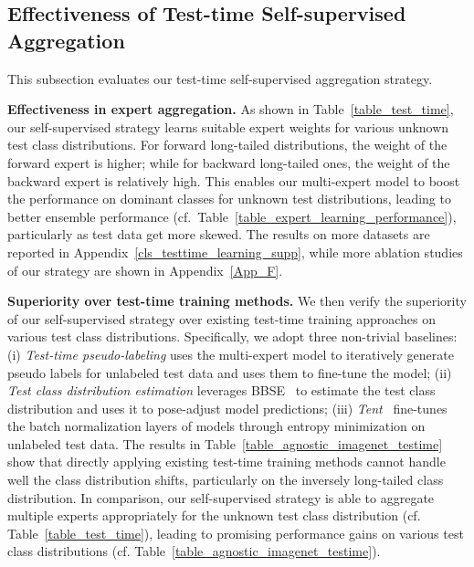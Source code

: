 \documentclass{article}
\begin{document}
\subsection{Effectiveness of Test-time Self-supervised Aggregation}
\label{cls_testtime_learning}
This subsection evaluates our test-time self-supervised aggregation strategy.

\textbf{Effectiveness in expert aggregation.} As shown in Table~\ref{table_test_time}, our self-supervised   strategy    learns suitable expert   weights for  various unknown   test class distributions.  For   forward long-tailed   distributions, the weight of  the forward expert  is higher; while for     backward long-tailed   ones,  the weight of  the  backward expert  is relatively high. This enables our multi-expert model to boost the performance  on   dominant  classes  for   unknown test   distributions, leading to   better ensemble performance (cf.~Table~\ref{table_expert_learning_performance}), particularly as test data get  more skewed.    The      results on more datasets  are reported in Appendix~\ref{cls_testtime_learning_supp}, while more ablation studies of our strategy are shown in Appendix~\ref{App_F}. 

 

\textbf{Superiority over test-time training methods.} We then verify the superiority of our self-supervised   strategy over existing test-time training approaches  on various test class distributions. Specifically, we adopt three non-trivial baselines: (i) \emph{Test-time pseudo-labeling}  uses the multi-expert  model to iteratively generate  pseudo  labels  for unlabeled test data and  uses them to fine-tune the    model; (ii) \emph{Test class distribution estimation}  leverages BBSE~\cite{lipton2018detecting} to estimate the test class distribution and   uses it to pose-adjust model predictions;
  (iii) \emph{Tent}~\cite{wang2021tent}  fine-tunes the batch normalization layers  of models through entropy minimization  on unlabeled test data. The results in Table~\ref{table_agnostic_imagenet_testime} show  that directly   applying  existing  test-time training methods cannot handle well the class distribution shifts, particularly on the inversely 
long-tailed class distribution. In comparison, our self-supervised  strategy is able to   aggregate multiple experts appropriately for the unknown test class distribution (cf. Table~\ref{table_test_time}), leading to  promising performance gains on various    test class  distributions (cf. Table~\ref{table_agnostic_imagenet_testime}).  
\end{document}
